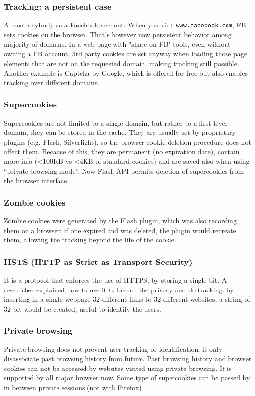\documentclass[a4paper, 10pt, titlepage]{article}
\begin{document}
\subsubsection*{Tracking: a persistent case}
Almost anybody as a Facebook account. When you visit \lstinline|www.facebook.com|, FB sets cookies on the browser. That’s however now persistent behavior among majority of domains. In a web page with "share on FB" tools, even without owning a FB account, 3rd party cookies are set anyway when loading those page elements that are not on the requested domain, making tracking still possible. Another example is Captcha by Google, which is offered for free but also enables tracking over different domains.

\subsubsection*{Supercookies}
Supercookies are not limited to a single domain, but rather to a first level domain; they can be stored in the cache. They are usually set by proprietary plugins (e.g. Flash, Silverlight), so the browser cookie deletion procedure does not affect them. Because of this, they are permanent (no expiration date), contain more info (<100KB vs <4KB of standard cookies) and are saved also when using “private browsing mode”. Now Flash API permits deletion of supercookies from the browser interface.

\subsubsection*{Zombie cookies}
Zombie cookies were generated by the Flash plugin, which was also recording them on a browser: if one expired and was deleted, the plugin would recreate them, allowing the tracking beyond the life of the cookie. 

\subsubsection*{HSTS (HTTP as Strict as Transport Security)}
It is a protocol that enforces the use of HTTPS, by storing a single bit. A researcher explained how to use it to breach the privacy and do tracking: by inserting in a single webpage 32 different links to 32 different websites, a string of 32 bit would be created, useful to identify the users.

\subsubsection*{Private browsing}
Private browsing does not prevent user tracking or identification, it only disassociate past browsing history from future. Past browsing history and browser cookies can not be accessed by websites visited using private browsing. It is supported by all major browser now. Some type of supercookies can be passed by in between private sessions (not with Firefox). 
\end{document}
